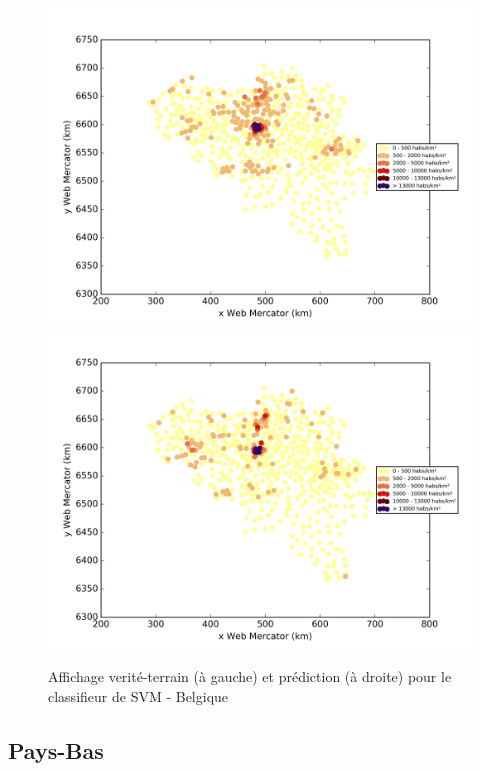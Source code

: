 \documentclass{book}
\begin{document}
\begin{figure}[H]
\centerline{
\includegraphics[scale=0.5]{../../data/Belgique/test/Support_Vector_Gaussian_Classification/Support_Vector_Gaussian_Classification/density_ground_truth.png}
\includegraphics[scale=0.5]{../../data/Belgique/test/Support_Vector_Gaussian_Classification/Support_Vector_Gaussian_Classification/density_classification.png}
}
\caption{Affichage verité-terrain (à gauche) et prédiction (à droite) pour le classifieur de SVM - Belgique}
\label{svm_carte_belgique}
\end{figure}


\subsection{Pays-Bas}
\end{document}
